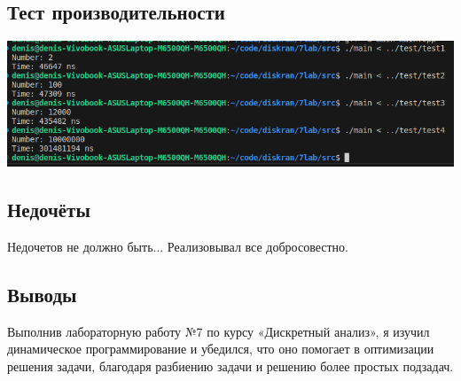 \documentclass[12pt]{article}
\begin{document}
\subsection*{Тест производительности}

\includegraphics[width=7in]{time.png}

\subsection*{Недочёты}

Недочетов не должно быть... Реализовывал все добросовестно.

\subsection*{Выводы}

Выполнив лабораторную работу №7 по курсу «Дискретный анализ», я изучил
динамическое программирование и убедился, что оно помогает в оптимизации
решения задачи, благодаря разбиению задачи и решению более простых
подзадач.
\end{document}
